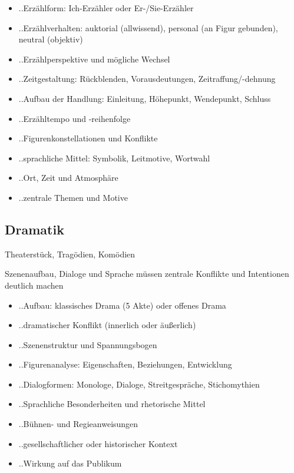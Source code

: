 \begin{itemize}
    \item ..Erzählform: Ich-Erzähler oder Er-/Sie-Erzähler
    \item ..Erzählverhalten: auktorial (allwissend), personal (an Figur gebunden), neutral (objektiv)
    \item ..Erzählperspektive und mögliche Wechsel
    \item ..Zeitgestaltung: Rückblenden, Vorausdeutungen, Zeitraffung/-dehnung
    \item ..Aufbau der Handlung: Einleitung, Höhepunkt, Wendepunkt, Schluss
    \item ..Erzähltempo und -reihenfolge
    \item ..Figurenkonstellationen und Konflikte
    \item ..sprachliche Mittel: Symbolik, Leitmotive, Wortwahl
    \item ..Ort, Zeit und Atmosphäre
    \item ..zentrale Themen und Motive
\end{itemize}


\subsection{Dramatik}

 Theaterstück, Tragödien, Komödien

 Szenenaufbau, Dialoge und Sprache müssen zentrale Konflikte und Intentionen deutlich machen

\begin{itemize}
    \item ..Aufbau: klassisches Drama (5 Akte) oder offenes Drama
    \item ..dramatischer Konflikt (innerlich oder äußerlich)
    \item ..Szenenstruktur und Spannungsbogen
    \item ..Figurenanalyse: Eigenschaften, Beziehungen, Entwicklung
    \item ..Dialogformen: Monologe, Dialoge, Streitgespräche, Stichomythien
    \item ..Sprachliche Besonderheiten und rhetorische Mittel
    \item ..Bühnen- und Regieanweisungen
    \item ..gesellschaftlicher oder historischer Kontext
    \item ..Wirkung auf das Publikum
\end{itemize}
